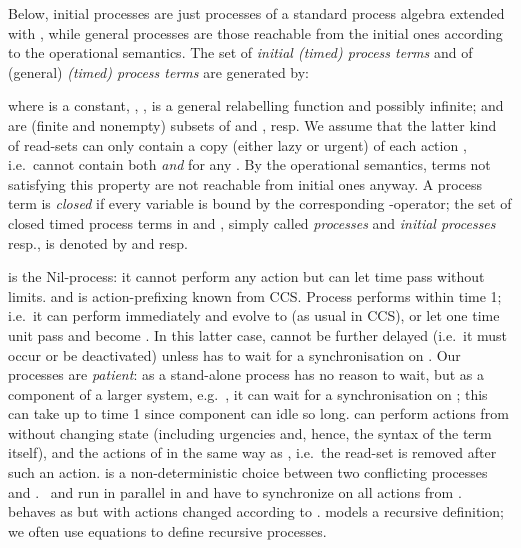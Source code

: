 \documentclass[copyright,creativecommons]{eptcs}
\begin{document}
Below, initial processes are just processes of a standard process algebra
extended with , while general processes are those reachable from the
initial ones according to the operational semantics.
The set  of {\em initial (timed) process terms}  and  of
(general) {\em (timed) process terms}  are generated by:


\vspace{0.1cm}
\hspace{3cm}


\hspace{3.2cm} 


\vspace{0.1cm}

where   is a constant, , ,   is a
general relabelling function and  possibly infinite;
   and  are (finite
and nonempty) subsets of   and , resp.
We assume that the latter kind of read-sets can only contain a copy (either
lazy or urgent) of each action , i.e.\ 
cannot contain both  {\em and}  for any . By the operational semantics, terms not satisfying this property
are not reachable from initial ones anyway.  
A process term is {\em closed} if every variable  is bound by the
corresponding -operator; the set of closed timed process terms in
 and , simply called {\em processes} and {\em initial
processes} resp., is denoted by  and  resp.


 is the Nil-process: it cannot perform any action but can let time
pass without limits.  and  is
action-prefixing known from CCS. Process  performs 
within time 1; i.e.\ it can perform  immediately and evolve to 
(as usual in CCS), or let one time unit pass and become
. In this latter case,  cannot be further
delayed (i.e.\ it must occur or be deactivated) unless
 has to wait for a synchronisation on . Our processes are {\em patient}: as a stand-alone process
 has no reason to wait, but as a component of a larger
system, e.g.\ , it can wait for a
synchronisation on ; this can take up to time 1 since component 
can idle so long.  can perform actions from
 without changing state (including urgencies and,
hence, the syntax of the term itself), and the actions of  in the same
way as , i.e.\ the read-set is removed after such an action. 
is a non-deterministic choice between two conflicting processes  and
. \  and  run in parallel in  and have to
synchronize on all actions from .  behaves as  but with
actions changed according to  .  models a recursive
definition; we often use equations to define recursive processes. 
\end{document}
